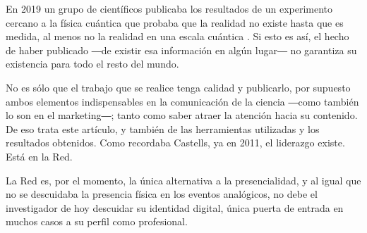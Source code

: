 \documentclass{textolivre}
\begin{document}
En 2019 un grupo de científicos publicaba los resultados de un experimento cercano a la física cuántica que probaba que la realidad no existe hasta que es medida, al menos no la realidad en una escala cuántica \cite{proietti_experimental_2019}. Si esto es así, el hecho de haber publicado ―de existir esa información en algún lugar― no garantiza su existencia para todo el resto del mundo.

No es sólo que el trabajo que se realice tenga calidad y publicarlo, por supuesto ambos elementos indispensables en la comunicación de la ciencia ―como también lo son en el marketing―; tanto como saber atraer la atención hacia su contenido. De eso trata este artículo, y también de las herramientas utilizadas y los resultados obtenidos.
Como recordaba Castells, ya en 2011, el liderazgo existe. Está en la Red.

La Red es, por el momento, la única alternativa a la presencialidad, y al igual que no se descuidaba la presencia física en los eventos analógicos, no debe el investigador de hoy descuidar su identidad digital, única puerta de entrada en muchos casos a su perfil como profesional.

\printbibliography\label{sec-bib}
\end{document}
